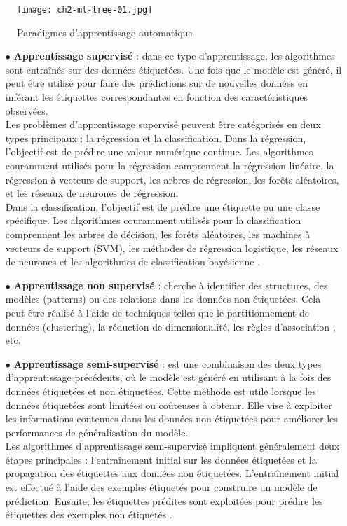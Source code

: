 \begin{figure}[H]
	\centering
	\texttt{[image: ch2-ml-tree-01.jpg]}
	\caption{Paradigmes d'apprentissage automatique}
    \label{fig:ch2-ml-tree-01}
\end{figure}

\begin{enumerate}
\item [$\bullet$] \textbf{Apprentissage supervisé} : dans ce type d'apprentissage, les algorithmes sont entraînés sur des données étiquetées. 
Une fois que le modèle est généré, il peut être utilisé pour faire des prédictions sur de nouvelles données en inférant les étiquettes correspondantes en fonction des caractéristiques observées.\\
Les problèmes d'apprentissage supervisé peuvent être catégorisés en deux types principaux : la régression et la classification. Dans la régression, l'objectif est de prédire une valeur numérique continue. Les algorithmes couramment utilisés pour la régression comprennent la régression linéaire, la régression à vecteurs de support, les arbres de régression, les forêts aléatoires, et les réseaux de neurones de régression.
\\
Dans la classification, l'objectif est de prédire une étiquette ou une classe spécifique. Les algorithmes couramment utilisés pour la classification comprennent les arbres de décision, les forêts aléatoires, les machines à vecteurs de support (SVM), les méthodes de régression logistique, les réseaux de neurones et les algorithmes de classification bayésienne \cite{supervise_goodfellow2016deep}.

\item [$\bullet$] \textbf{Apprentissage non supervisé} : cherche à identifier des structures, des modèles (patterns) ou des relations dans les données non étiquetées. Cela peut être réalisé à l'aide de techniques telles que le partitionnement de données (clustering), la réduction de dimensionalité, les règles d'association \cite{non_supervise_goodfellow2016deep}, etc. 

\item [$\bullet$] \textbf{Apprentissage semi-supervisé } : est une combinaison des deux types d'apprentissage précédents, où le modèle est généré en utilisant à la fois des données étiquetées et non étiquetées. Cette méthode est utile lorsque les données étiquetées sont limitées ou coûteuses à obtenir. Elle vise à exploiter les informations contenues dans les données non étiquetées pour améliorer les performances de généralisation du modèle.
\\
Les algorithmes d'apprentissage semi-supervisé impliquent généralement deux étapes principales : l'entraînement initial sur les données étiquetées et la propagation des étiquettes aux données non étiquetées. L'entraînement initial est effectué à l'aide des exemples étiquetés pour construire un modèle de prédiction. Ensuite, les étiquettes prédites sont exploitées pour prédire les étiquettes des exemples non étiquetés \cite{semi-supervise_chapelle2006semi}.


\end{enumerate}
